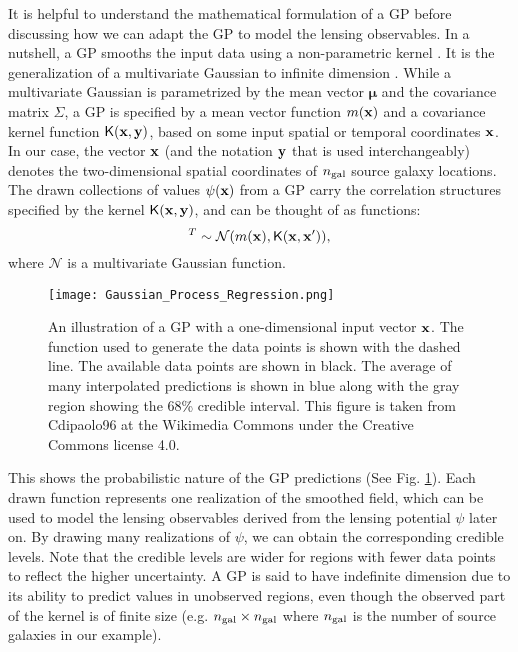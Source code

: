 It is helpful to understand the mathematical formulation of a GP 
before discussing how we can adapt the GP to model the lensing observables. 
In a nutshell, a GP smooths the input data using a non-parametric kernel
\citep{Hastie1990}. 
It is the generalization of a multivariate Gaussian 
to infinite dimension \citep{Rasmussen2006}. 
While a multivariate Gaussian is parametrized by  
the mean vector $\mathbf{\mu}$ and the covariance matrix $\Sigma$, 
a GP is specified by a mean vector function $m(\mathbf{x})$ and a
covariance kernel function $\mathsf{K}(\mathbf{x}, \mathbf{y})$, based on some input spatial or
temporal coordinates $\mathbf{x}$. In our case, the vector $\mathbf{x}$ (and the
 notation $\mathbf{y}$ that is used interchangeably) denotes the
two-dimensional spatial coordinates of $n_{\rm gal}$ source galaxy locations. 
The drawn collections of values $\psi(\mathbf{x})$ from a GP carry the correlation structures
specified by the kernel $\mathsf{K}(\mathbf{x}, \mathbf{y})$, and can be thought of as
functions: 
\begin{equation}
	[\psi_1(\xv), \psi_2(\xv) \ldots, \psi_m(\xv) ]^T \sim \mathcal{N}(m(\xv),
	\kerngp(\xv, \xv')),
		\label{eq:GP}
\end{equation}
where $\mathcal{N}$ is a multivariate Gaussian function.
\begin{figure}
	\centering
	\texttt{[image: Gaussian\_Process\_Regression.png]}
	\caption{An illustration of a GP with a one-dimensional input vector ${\bf x}$. The
		function used to generate the data points 
		is shown with the dashed line. The available data points are shown in
		black. The average of many interpolated predictions is shown in blue
		along with the gray region showing the 68\% 
		credible interval. This figure is taken from Cdipaolo96 at 
		the Wikimedia Commons under the Creative Commons license 4.0.
\label{fig:one_d_gaussian_process}}
\end{figure}
This shows the probabilistic nature of the GP predictions
(See Fig. \ref{fig:one_d_gaussian_process}).
Each drawn function represents one realization of the smoothed
field, which can be used to model the lensing observables derived 
from the lensing potential $\psi$ later on. 
By drawing many realizations of $\psi$, we can obtain the
corresponding credible levels.
Note that the credible levels are wider for regions with fewer data points to reflect
the higher uncertainty. A GP is said to have indefinite dimension due to its ability to
predict values in unobserved regions, even though the 
observed part of the kernel is of finite size (e.g. $n_{\rm gal} \times n_{\rm gal}$ where
$n_{\rm gal}$ is the number of source galaxies in our example). 

